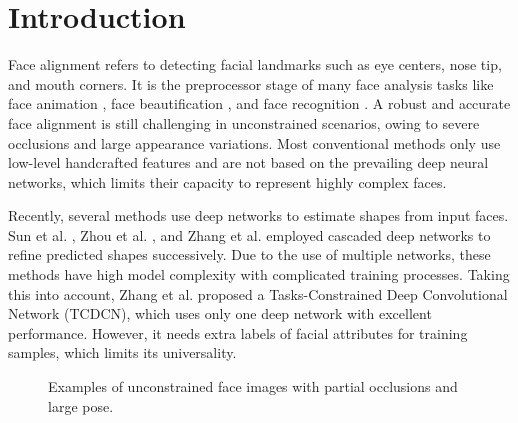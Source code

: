 \documentclass[journal]{IEEEtran}
\begin{document}
\section{Introduction}
\label{sec:intro}

Face alignment refers to detecting facial landmarks such as eye centers, nose tip, and mouth corners. It is the preprocessor stage of many face analysis tasks like face animation \cite{cao2014displaced}, face beautification \cite{fan2016efficient}, and face recognition \cite{leng2016cascade}. A robust and accurate face alignment is still challenging in unconstrained scenarios, owing to severe occlusions and large appearance variations. Most conventional methods \cite{cao2012face,xiong2013supervised,burgos2013robust,ren2014face} only use low-level handcrafted features and are not based on the prevailing deep neural networks, which limits their capacity to represent highly complex faces.

Recently, several methods use deep networks to estimate shapes from input faces. Sun et al. \cite{sun2013deep}, Zhou et al. \cite{zhou2013extensive}, and Zhang et al. \cite{zhang2014coarse} employed cascaded deep networks to refine predicted shapes successively. Due to the use of multiple networks, these methods have high model complexity with complicated training processes. Taking this into account, Zhang et al. \cite{zhang2014facial,zhang2015learning} proposed a Tasks-Constrained Deep Convolutional Network (TCDCN), which uses only one deep network with excellent performance. However, it needs extra labels of facial attributes for training samples, which limits its universality.

\begin{figure}[!htb]
  \centering
  \hspace{0.2in}
  \caption{Examples of unconstrained face images with partial occlusions and large pose.}
  \label{fig:unconstrained} %
\end{figure}
\end{document}
